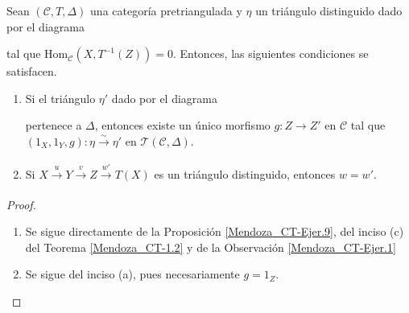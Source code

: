\documentclass[tesis]{subfiles}
\begin{document}
\begin{Coro}\label{Mendoza_CT-Ejer.10}

    Sean $(\mathscr{C},T,\Delta)$ una categoría pretriangulada y $\eta$ un triángulo distinguido dado por el diagrama
    \begin{center}
    \end{center}
    tal que $\text{Hom}_\mathscr{C}(X,T^{-1}(Z))=0$. Entonces, las siguientes condiciones se satisfacen.

    \begin{enumerate}[label=(\alph*)]

        \item Si el triángulo $\eta'$ dado por el diagrama 
            \begin{center}
            \end{center}
            pertenece a $\Delta$, entonces existe un único morfismo $g:Z\to Z'$ en $\mathscr{C}$ tal que $(1_X,1_Y,g):\eta\xrightarrow[]{\sim}\eta'$ en $\mathscr{T}(\mathscr{C},\Delta)$.

        \item Si $X\xrightarrow[]{u}Y\xrightarrow[]{v}Z\xrightarrow[]{w'}T(X)$ es un triángulo distinguido, entonces $w=w'$.
    \end{enumerate}
\end{Coro}

\begin{proof}\leavevmode

    \begin{enumerate}[label=(\alph*)]
    
        \item Se sigue directamente de la Proposición \ref{Mendoza_CT-Ejer.9}, del inciso (c) del Teorema \ref{Mendoza_CT-1.2} y de la Observación \ref{Mendoza_CT-Ejer.1}

        \item Se sigue del inciso (a), pues necesariamente $g=1_Z$.
    \end{enumerate}
\end{proof}
\end{document}

